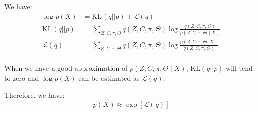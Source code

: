 \documentclass[12pt]{article}
\newenvironment{problem}[2][Problem]{\begin{trivlist}
\item[\hskip \labelsep {\bfseries #1}\hskip \labelsep {\bfseries #2.}]}{\end{trivlist}}
\begin{document}
\begin{problem}{2.8.24}
We have:
\begin{align*}
    \log p(X) &= \mathrm{KL}(q||p) + \mathcal{L}(q) \\
    \mathrm{KL}(q||p) &= 
        \sum_{Z,C,\pi,\Theta} q(Z,C,\pi,\Theta) 
        \log\frac{q(Z,C,\pi,\Theta)}{p(Z,C,\pi,\Theta\mid X)} \\
    \mathcal{L}(q) &= 
        \sum_{Z,C,\pi,\Theta} q(Z,C,\pi,\Theta) 
        \log\frac{p(Z,C,\pi,\Theta, X)}{q(Z,C,\pi,\Theta)} \\
\end{align*}

When we have a good approximation of $p(Z,C,\pi,\Theta\mid X)$, $\mathrm{KL}(q||p)$
will tend to zero and $\log p(X)$ can be estimated as $\mathcal{L}(q)$. 

Therefore, we have:
\begin{align*}
    p(X) \approx \exp[\mathcal{L}(q)]
\end{align*}
\end{problem}
\pagebreak
\end{document}
